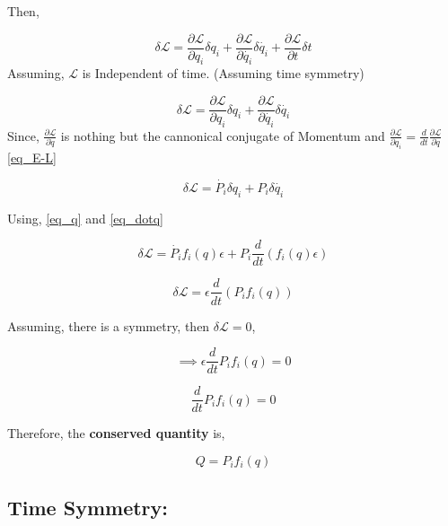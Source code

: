 \documentclass[a4paper]{article}
\newcommand{\Lagr}{\mathcal{L}}
\newcommand{\ddt}{\frac{d}{dt}}
\newcommand{\pdt}[2]{\frac{\partial #1}{\partial #2}}
\begin{document}
			Then,

			$$ \delta \Lagr = \pdt{\Lagr}{q_i}\delta q_i + \pdt{\Lagr}{\dot{q_i}}\delta \dot{q_i} + \pdt{\Lagr}{t} \delta t $$
			Assuming, $\Lagr$ is Independent of time. (Assuming time symmetry)

			$$ \delta \Lagr = \pdt{\Lagr}{q_i}\delta q_i + \pdt{\Lagr}{\dot{q_i}}\delta \dot{q_i} $$
			Since, $\pdt{\Lagr}{\dot{q}}$ is nothing but the cannonical conjugate of Momentum and $\pdt{\Lagr}{q_i}=\ddt \pdt{\Lagr}{\dot{q}}$\eqref{eq_E-L}

			\begin{equation}
				\delta \Lagr = \dot{P_i}\delta q_i + P_i \delta \dot{q_i} \label{eq_var_L}
			\end{equation}

			Using, \eqref{eq_q} and \eqref{eq_dotq}

			$$ \delta \Lagr = \dot{P_i} f_i(q) \epsilon + P_i \ddt(f_i(q)\epsilon) $$

			$$ \delta \Lagr = \epsilon \ddt(P_i f_i(q)) $$
			
			Assuming, there is a symmetry, then $\delta \Lagr = 0$,

			$$\implies \epsilon \ddt{P_i f_i(q)} = 0$$

			$$ \ddt{P_i f_i(q)} = 0 $$

			Therefore, the \textbf{conserved quantity} is,

			\begin{equation}
				Q = P_i f_i(q) \label{eq_conserved_Q}
			\end{equation}
		
		\subsection*{Time Symmetry: } \label{time_symmetry}
			\noindent \\






\end{document}
